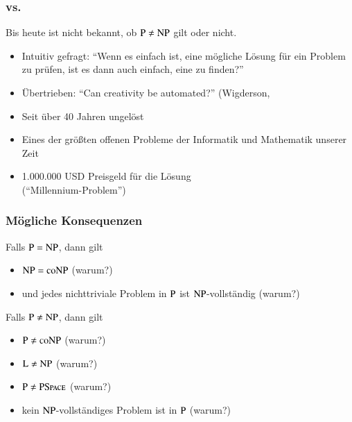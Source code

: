 \documentclass[aspectratio=1610,onlymath]{beamer}
\begin{document}
\begin{frame}\frametitle{ vs. }

  \alert{Bis heute ist nicht bekannt, ob ${\textsc{P}}\neq{\textsc{NP}}$ gilt oder nicht.}
  \begin{itemize}
  \item Intuitiv gefragt: "`Wenn es einfach ist, eine mögliche Lösung für ein Problem zu prüfen, ist es dann auch einfach, eine zu finden?"'
  \item Übertrieben: "`Can creativity be automated?"' (Wigderson, 
  \item Seit über 40 Jahren ungelöst
  \item Eines der größten offenen Probleme der Informatik und Mathematik unserer Zeit
  \item 1.000.000 USD Preisgeld für die Lösung\\("`Millennium-Problem"')
  \end{itemize}

\end{frame}

\begin{frame}\frametitle{Mögliche Konsequenzen}

\alert{Falls ${\textsc{P}}={\textsc{NP}}$, dann gilt}
\begin{itemize}
\item ${\textsc{NP}}={\textsc{coNP}}$ (warum?)
\item und jedes nichttriviale Problem in ${\textsc{P}}$ ist ${\textsc{NP}}$-vollständig (warum?)
\end{itemize}
\bigskip\pause

\alert{Falls ${\textsc{P}}\neq{\textsc{NP}}$, dann gilt}
\begin{itemize}
\item ${\textsc{P}}\neq{\textsc{coNP}}$ (warum?)
\item ${\textsc{L}}\neq{\textsc{NP}}$ (warum?)
\item ${\textsc{P}}\neq{\textsc{PSpace}}$ (warum?)
\item kein ${\textsc{NP}}$-vollständiges Problem ist in ${\textsc{P}}$ (warum?)
\end{itemize}

\end{frame}
\end{document}
